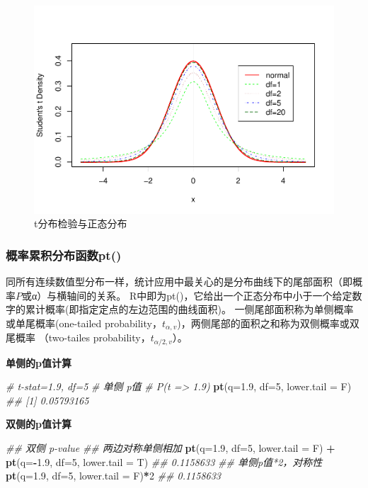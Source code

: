 \documentclass[
]{article}
\newenvironment{Shaded}{\begin{snugshade}}{\end{snugshade}}
\newcommand{\CommentTok}[1]{\textcolor[rgb]{0.56,0.35,0.01}{\textit{#1}}}
\newcommand{\DataTypeTok}[1]{\textcolor[rgb]{0.13,0.29,0.53}{#1}}
\newcommand{\DecValTok}[1]{\textcolor[rgb]{0.00,0.00,0.81}{#1}}
\newcommand{\FloatTok}[1]{\textcolor[rgb]{0.00,0.00,0.81}{#1}}
\newcommand{\KeywordTok}[1]{\textcolor[rgb]{0.13,0.29,0.53}{\textbf{#1}}}
\newcommand{\NormalTok}[1]{#1}
\newcommand{\OperatorTok}[1]{\textcolor[rgb]{0.81,0.36,0.00}{\textbf{#1}}}
\newcommand{\StringTok}[1]{\textcolor[rgb]{0.31,0.60,0.02}{#1}}
\begin{document}
\begin{figure}

{\centering \includegraphics[width=0.49\linewidth,height=0.49\textheight]{figs/tdist} 

}

\caption{t分布检验与正态分布}\label{fig:tdist}
\end{figure}

\hypertarget{ux6982ux7387ux7d2fux79efux5206ux5e03ux51fdux6570pt}{%
\subsubsection{概率累积分布函数pt()}\label{ux6982ux7387ux7d2fux79efux5206ux5e03ux51fdux6570pt}}

同所有连续数值型分布一样，统计应用中最关心的是分布曲线下的尾部面积（即概率\(P\)或α）与横轴间的关系。
R中即为pt()，它给出一个正态分布中小于一个给定数字的累计概率(即指定定点的左边范围的曲线面积)。
一侧尾部面积称为单侧概率或单尾概率(one-tailed probability，\(t_{α,v}\))，两侧尾部的面积之和称为双侧概率或双尾概率
（two-tailes probability，\(t_{α/2,v}\)）。

\textbf{单侧的p值计算}

\begin{Shaded}
\begin{Highlighting}[]
\CommentTok{# t-stat=1.9, df=5}
\CommentTok{# 单侧 p值}
\CommentTok{# P(t => 1.9)}
\KeywordTok{pt}\NormalTok{(}\DataTypeTok{q=}\FloatTok{1.9}\NormalTok{, }\DataTypeTok{df=}\DecValTok{5}\NormalTok{, }\DataTypeTok{lower.tail =}\NormalTok{ F)}
\CommentTok{## [1] 0.05793165}
\end{Highlighting}
\end{Shaded}

\textbf{双侧的p值计算}

\begin{Shaded}
\begin{Highlighting}[]
\CommentTok{## 双侧 p-value}
\CommentTok{## 两边对称单侧相加}
\KeywordTok{pt}\NormalTok{(}\DataTypeTok{q=}\FloatTok{1.9}\NormalTok{, }\DataTypeTok{df=}\DecValTok{5}\NormalTok{, }\DataTypeTok{lower.tail =}\NormalTok{ F) }\OperatorTok{+}\StringTok{ }\KeywordTok{pt}\NormalTok{(}\DataTypeTok{q=}\OperatorTok{-}\FloatTok{1.9}\NormalTok{, }\DataTypeTok{df=}\DecValTok{5}\NormalTok{, }\DataTypeTok{lower.tail =}\NormalTok{ T)}
\CommentTok{## 0.1158633}
\CommentTok{## 单侧p值*2，对称性}
\KeywordTok{pt}\NormalTok{(}\DataTypeTok{q=}\FloatTok{1.9}\NormalTok{, }\DataTypeTok{df=}\DecValTok{5}\NormalTok{, }\DataTypeTok{lower.tail =}\NormalTok{ F)}\OperatorTok{*}\DecValTok{2}
\CommentTok{## 0.1158633}
\end{Highlighting}
\end{Shaded}
\end{document}
